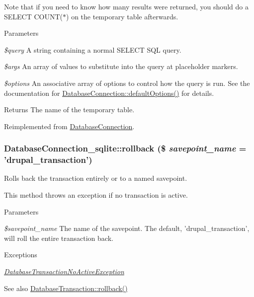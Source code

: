 Note that if you need to know how many results were returned, you should do a SELECT COUNT($\ast$) on the temporary table afterwards.


\begin{DoxyParams}{Parameters}
\item[{\em \$query}]A string containing a normal SELECT SQL query. \item[{\em \$args}]An array of values to substitute into the query at placeholder markers. \item[{\em \$options}]An associative array of options to control how the query is run. See the documentation for \hyperlink{classDatabaseConnection_a190539d6c494ef2d7ac90d21226de5a5}{DatabaseConnection::defaultOptions()} for details.\end{DoxyParams}
\begin{DoxyReturn}{Returns}
The name of the temporary table. 
\end{DoxyReturn}


Reimplemented from \hyperlink{classDatabaseConnection_ae4d9ad286187f493172da04fca77ca8f}{DatabaseConnection}.\hypertarget{classDatabaseConnection__sqlite_aa0c95a9076d4aa2d08569d344eeb81de}{
\subsubsection[{rollback}]{\setlength{\rightskip}{0pt plus 5cm}DatabaseConnection\_\-sqlite::rollback (\$ {\em savepoint\_\-name} = {\ttfamily 'drupal\_\-transaction'})}}
\label{classDatabaseConnection__sqlite_aa0c95a9076d4aa2d08569d344eeb81de}
Rolls back the transaction entirely or to a named savepoint.

This method throws an exception if no transaction is active.


\begin{DoxyParams}{Parameters}
\item[{\em \$savepoint\_\-name}]The name of the savepoint. The default, 'drupal\_\-transaction', will roll the entire transaction back.\end{DoxyParams}

\begin{DoxyExceptions}{Exceptions}
\item[{\em \hyperlink{classDatabaseTransactionNoActiveException}{DatabaseTransactionNoActiveException}}]\end{DoxyExceptions}
\begin{DoxySeeAlso}{See also}
\hyperlink{classDatabaseTransaction_a51bdf8ca9423cc331e877dbf43cd6981}{DatabaseTransaction::rollback()} 
\end{DoxySeeAlso}


